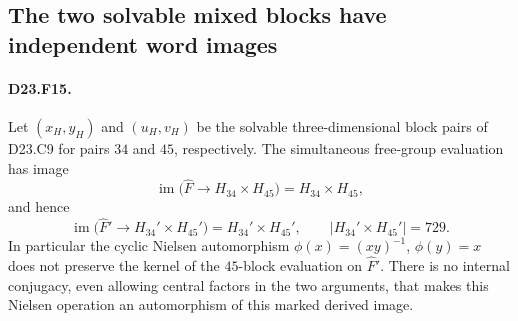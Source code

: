 \subsection{The two solvable mixed blocks have independent word images}

\paragraph{D23.F15.}
Let $(x_H,y_H)$ and $(u_H,v_H)$ be the solvable
three-dimensional block pairs of D23.C9 for pairs $34$
and $45$, respectively.  The simultaneous free-group
evaluation has image
\[
 \operatorname{im}\bigl(\widehat F\longrightarrow
       H_{34}\times H_{45}\bigr)=H_{34}\times H_{45},
\]
and hence
\[
 \operatorname{im}\bigl(\widehat F'\longrightarrow
       H_{34}'\times H_{45}'\bigr)=H_{34}'\times H_{45}',
 \qquad |H_{34}'\times H_{45}'|=729.
\tag{D23.F15.1}
\]
In particular the cyclic Nielsen automorphism
$\phi(x)=(xy)^{-1}$, $\phi(y)=x$ does not preserve
the kernel of the $45$-block evaluation on $\widehat F'$.
There is no internal conjugacy, even allowing central
factors in the two arguments, that makes this Nielsen
operation an automorphism of this marked derived image.

